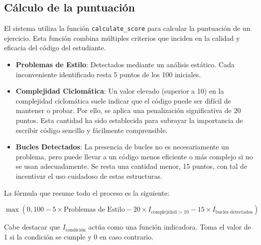 \subsection{Cálculo de la puntuación}

El sistema utiliza la función \texttt{calculate\_score} para calcular la puntuación de un ejercicio. Esta función combina múltiples criterios que inciden en la calidad y eficacia del código del estudiante.

\begin{itemize}
    \item \textbf{Problemas de Estilo}: Detectados mediante un análisis estático. Cada inconveniente identificado resta 5 puntos de los 100 iniciales.
    
    \item \textbf{Complejidad Ciclomática}: Un valor elevado (superior a 10) en la complejidad ciclomática suele indicar que el código puede ser difícil de mantener o probar. Por ello, se aplica una penalización significativa de 20 puntos. Esta cantidad ha sido establecida para subrayar la importancia de escribir código sencillo y fácilmente comprensible.
        
    \item \textbf{Bucles Detectados}: La presencia de bucles no es necesariamente un problema, pero puede llevar a un código menos eficiente o más complejo si no se usan adecuadamente. Se resta una cantidad menor, 15 puntos, con tal de incentivar el uso cuidadoso de estas estructuras.    
\end{itemize}

La fórmula que resume todo el proceso es la siguiente:

\begin{equation}
\max \left( 0, 100 - 5 \times \text{Problemas de Estilo} - 20 \times I_{\text{complejidad > 10}} - 15 \times I_{\text{bucles detectados}} \right)
\end{equation}

Cabe destacar que $I_{\text{condición}}$ actúa como una función indicadora. Toma el valor de 1 si la condición se cumple y 0 en caso contrario.


